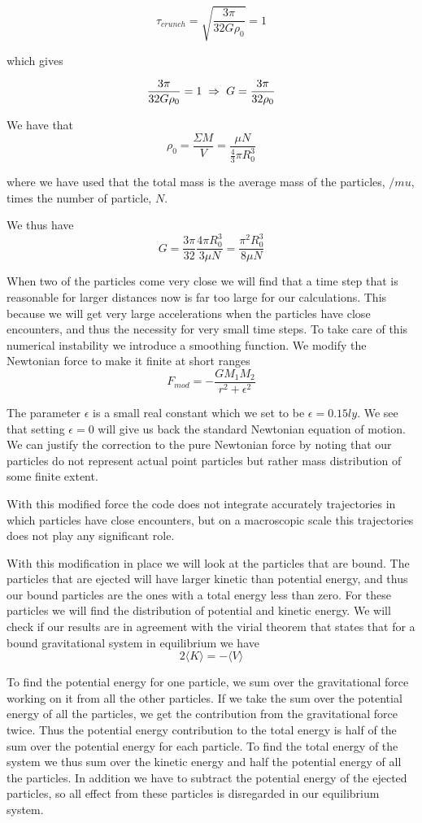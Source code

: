 \documentclass[a4paper,12pt, english]{article}
\begin{document}
\[
\tau_{crunch} = \sqrt{\frac{3 \pi}{32 G \rho_0}} = 1
\]

which gives

\[
\frac{3 \pi}{32G \rho_0} = 1 \hspace{1mm} \Rightarrow \hspace{1mm} G = \frac{3 \pi}{32 \rho_0}
\]

We have that
\[
\rho_0 = \frac{\Sigma M}{V} = \frac{\mu N}{ \frac{4}{3} \pi R_0^3}
\]

where we have used that the total mass is the average mass of the particles, $/mu$, times the number of particle, $N$.

We thus have
\[
G = \frac{3 \pi}{32} \frac{4 \pi R_0^3}{3 \mu N} = \frac{\pi^2 R_0^ 3}{8 \mu N}
\]


When two of the particles come very close we will find that a time step that is reasonable for larger distances now is far too large for our calculations. This because we will get very large accelerations when the particles have close encounters, and thus the necessity for very small time steps. To take care of this numerical instability we introduce a smoothing function. We modify the Newtonian force to make it finite at short ranges
\[
F_{mod} = - \frac{GM_1M_2}{r^2 + \epsilon^2}
\]

The parameter $\epsilon$ is a small real constant which we set to be $\epsilon = 0.15 ly$. We see that setting $\epsilon = 0$ will give us back the standard Newtonian equation of motion. We can justify the correction to the pure Newtonian force by noting that our particles do not represent actual point particles but rather mass distribution of some finite extent.

With this modified force the code does not integrate accurately trajectories in which particles have close encounters, but on a macroscopic scale this trajectories does not play any significant role.


With this modification in place we will look at the particles that are bound. The particles that are ejected will have larger kinetic than potential energy, and thus our bound particles are the ones with a total energy less than zero. For these particles we will find the distribution of potential and kinetic energy. We will check if our results are in agreement with the virial theorem that states that for a bound gravitational system in equilibrium we have
\[
2\langle K\rangle = -\langle V \rangle
\]

To find the potential energy for one particle, we sum over the gravitational force working on it from all the other particles. If we take the sum over the potential energy of all the particles, we get the contribution from the gravitational force twice. Thus the potential energy contribution to the total energy is half of the sum over the potential energy for each particle.
To find the total energy of the system we thus sum over the kinetic energy and half the potential energy of all the particles. In addition we have to subtract the potential energy of the ejected particles, so all effect from these particles is disregarded in our equilibrium system.
\end{document}
